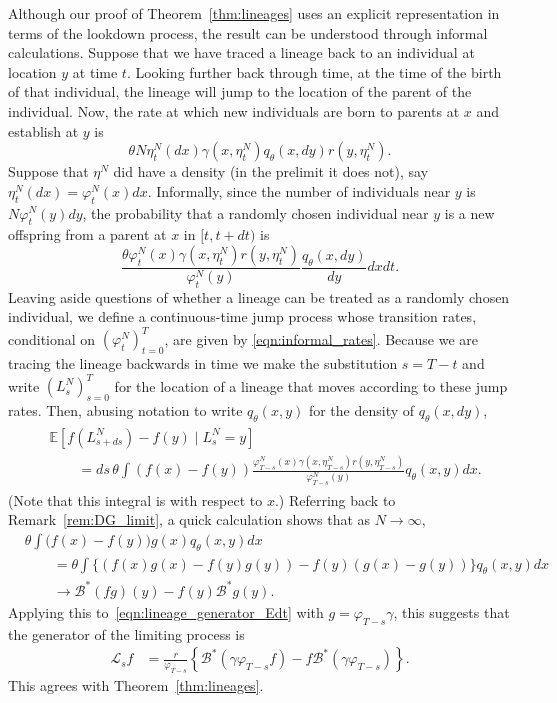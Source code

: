 \documentclass[EJP]{ejpecp} %
\newcommand{\IE}{\mathbb E}
\newcommand{\DG}{\mathcal{B}}  %
\newcommand{\Lgen}{\mathcal{L}}    %
\begin{document}
Although our proof of Theorem~\ref{thm:lineages}
uses an explicit representation in terms of the lookdown process,
the result can be understood through informal calculations.
Suppose that we have traced a lineage back to an individual 
at location $y$ at time $t$.
Looking further back through time, at the time of the birth of that 
individual, the lineage will jump to the location of the parent of the
individual.
Now, the rate at which new individuals are born to parents at $x$ 
and establish at $y$ is
$$
\theta N\eta^N_t(dx)    \gamma(x, \eta^N_t) q_\theta(x, dy) r(y, \eta^N_t) .
$$
Suppose that $\eta^N$ did have a density (in the prelimit it does not),
say $\eta^N_t(dx) = \varphi^N_t(x) dx$.
Informally,
since the number of individuals near $y$ is $N\varphi^N_t(y) dy$,
the probability that a randomly chosen individual near $y$
is a new offspring from a parent at $x$ in $[t, t+dt)$ is
\begin{equation} \label{eqn:informal_rates}
\frac{\theta
    \varphi^N_t(x) \gamma(x, \eta^N_t) r(y, \eta^N_t)
}{
    \varphi^N_t(y)
} \frac{ q_\theta(x, dy) }{ dy } dx dt .
\end{equation}
Leaving aside questions of whether a lineage can be treated 
as a randomly chosen individual, we define
a continuous-time jump process 
whose transition rates, conditional on $(\varphi^N_t)_{t=0}^T$, 
are given by \eqref{eqn:informal_rates}. Because we are tracing the
lineage backwards 
in time we make the substitution $s=T-t$ and write
$(L^N_s)_{s=0}^T$ for the location of a lineage that moves 
according to these jump rates.
Then, abusing notation to write 
$q_\theta(x, y)$ for the density of $q_\theta(x,dy)$,
\begin{align} \label{eqn:lineage_generator_Edt}
    \begin{split}
    &\IE[f(L^N_{s+ds}) - f(y) \;|\; L^N_s = y]
    \\&\qquad 
    =
    ds\, \theta \int \left(f(x) - f(y)\right)
    \frac{
        \varphi^N_{T-s}(x) \gamma(x, \eta^N_{T-s}) r(y, \eta^N_{T-s})
    }{
        \varphi^N_{T-s}(y)
    }
    q_\theta(x, y) dx .
    \end{split}
\end{align}
(Note that this integral is with respect to $x$.)
Referring back to Remark~\ref{rem:DG_limit},
a quick calculation shows that as $N \to \infty$,
\begin{align*}
    &
    \theta \int \big(f(x) - f(y)\big) g(x) q_\theta(x, y) dx \\
    &\qquad =
    \theta \int \big\{
        (f(x) g(x) - f(y) g(y)) - f(y) (g(x) - g(y))
    \big\} q_\theta(x, y) dx \\
    &\qquad \to
        \DG^*(fg)(y) - f(y) \DG^* g(y) . 
\end{align*}
Applying this to~\eqref{eqn:lineage_generator_Edt} with $g = \varphi_{T-s} \gamma$,
this suggests that the generator of the limiting process is
\begin{align} \label{eqn:heuristic_lineage_generator}
    \Lgen_s f
    &=
    \frac{r}{\varphi_{T-s}}
    \left\{
        \DG^*(\gamma \varphi_{T-s} f) - f \DG^*(\gamma \varphi_{T-s})
    \right\} .
\end{align}
This agrees with Theorem~\ref{thm:lineages}.
\end{document}
